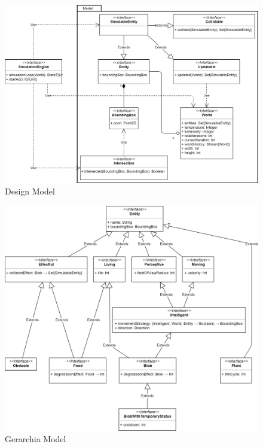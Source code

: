 \begin{figure}[h!]
\centering
\includegraphics[width=\textwidth, scale=0.44]{img/Model.png}
\caption{Design Model}
\label{fig:model}
\end{figure}

\begin{figure}[h!]
\centering
\includegraphics[width=\textwidth, scale=0.44]{img/ModelHierarchy.png}
\caption{Gerarchia Model}
\label{fig:modelhierarchy}
\end{figure}